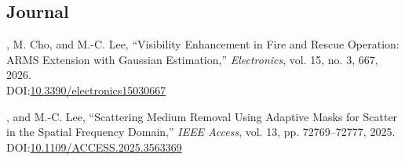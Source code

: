 \documentclass[a4paper,9pt]{extarticle}
\begin{document}
\subsection*{Journal}
\begin{enumerate}[label={[\arabic*]}, start=1]
    \item 
    , M. Cho, and M.-C. Lee,
    ``Visibility Enhancement in Fire and Rescue Operation: ARMS Extension with Gaussian Estimation,''
    \textit{Electronics},
    vol. 15, 
    no. 3, 
    667,
    2026. \\
    DOI:\href{https://doi.org/10.3390/electronics15030667}{10.3390/electronics15030667} 

    \item 
    , and M.-C. Lee,
    ``Scattering Medium Removal Using Adaptive Masks for Scatter in the Spatial Frequency Domain,''
    \textit{IEEE Access},
    vol. 13, 
    pp. 72769--72777, 
    2025. \\
    DOI:\href{https://doi.org/10.1109/ACCESS.2025.3563369}{10.1109/ACCESS.2025.3563369} 
\end{enumerate} 
\end{document}
